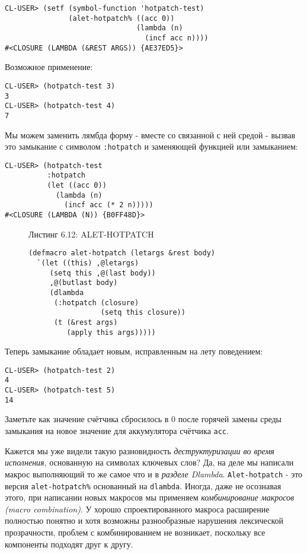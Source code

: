 \begin{verbatim}
CL-USER> (setf (symbol-function 'hotpatch-test)
               (alet-hotpatch% ((acc 0))
                               (lambda (n)
                                 (incf acc n))))
#<CLOSURE (LAMBDA (&REST ARGS)) {AE37ED5}>
\end{verbatim}

Возможное применение:

\begin{verbatim}
CL-USER> (hotpatch-test 3)
3
CL-USER> (hotpatch-test 4)
7
\end{verbatim}

Мы можем заменить лямбда форму - вместе со связанной с ней средой - вызвав это замыкание с символом \verb":hotpatch" и заменяющей функцией или замыканием:

\begin{verbatim}
CL-USER> (hotpatch-test
          :hotpatch
          (let ((acc 0))
            (lambda (n)
              (incf acc (* 2 n)))))
#<CLOSURE (LAMBDA (N)) {B0FF48D}>
\end{verbatim}

\begin{figure}Листинг 6.12: ALET-HOTPATCH\label{listing_6.12}
\listbegin
\begin{verbatim}
(defmacro alet-hotpatch (letargs &rest body)
  `(let ((this) ,@letargs)
     (setq this ,@(last body))
     ,@(butlast body)
     (dlambda
      (:hotpatch (closure)
                 (setq this closure))
      (t (&rest args)
         (apply this args)))))
\end{verbatim}
\listend
\end{figure}

Теперь замыкание обладает новым, исправленным на лету поведением:

\begin{verbatim}
CL-USER> (hotpatch-test 2)
4
CL-USER> (hotpatch-test 5)
14
\end{verbatim}

Заметьте как значение счётчика сбросилось в 0 после горячей замены среды замыкания на новое значение для аккумулятора счётчика \verb"acc".

Кажется мы уже видели такую разновидность \emph{деструктуризации во время исполнения}, основанную на символах ключевых слов? Да, на деле мы написали макрос выполняющий то же самое что и в \emph{разделе Dlambda}. \verb"Alet-hotpatch" - это версия \verb"alet-hotpatch%" основанный на \verb"dlambda". Иногда, даже не осознавая этого, при написании новых макросов мы применяем \emph{комбинирование макросов (macro combination)}. У хорошо спроектированного макроса расширение полностью понятно и хотя возможны разнообразные нарушения лексической прозрачности, проблем с комбинированием не возникает, поскольку все компоненты подходят друг к другу.

